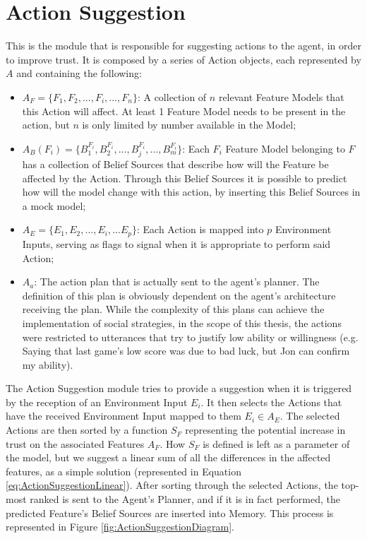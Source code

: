 \section{Action Suggestion}
\label{sec:ActionSuggestion}
This is the module that is responsible for suggesting actions to the agent, in order to improve trust. It is composed by a series of Action objects, each represented by $A$ and containing the following:
\begin{itemize}
    \item $A_F = \{F_1, F_2, ..., F_i, ..., F_n\}$: A collection of $n$ relevant Feature Models that this Action will affect. At least 1 Feature Model needs to be present in the action, but $n$ is only limited by number available in the Model;
    \item $A_B(F_i) = \{B_1^{F_i}, B_2^{F_i}, ..., B_j^{F_i}, ..., B_m^{F_i}\}$: Each $F_i$ Feature Model belonging to $F$ has a collection of Belief Sources that describe how will the Feature be affected by the Action. Through this Belief Sources it is possible to predict how will the model change with this action, by inserting this Belief Sources in a mock model;
    \item $A_E = \{E_1, E_2, ..., E_i, ... E_p\}$: Each Action is mapped into $p$ Environment Inputs, serving as flags to signal when it is appropriate to perform said Action;
    \item $A_a$: The action plan that is actually sent to the agent's planner. The definition of this plan is obviously dependent on the agent's architecture receiving the plan. While the complexity of this plans can achieve the implementation of social strategies, in the scope of this thesis, the actions were restricted to utterances that try to justify low ability or willingness (e.g. Saying that last game's low score was due to bad luck, but Jon can confirm my ability).
\end{itemize}

The Action Suggestion module tries to provide a suggestion when it is triggered by the reception of an Environment Input $E_i$. It then selects the Actions that have the received Environment Input mapped to them $E_i \in A_E$. The selected Actions are then sorted by a function $S_F$ representing the potential increase in trust on the associated Features $A_F$. How $S_F$ is defined is left as a parameter of the model, but we suggest a linear sum of all the differences in the affected features, as a simple solution (represented in Equation \ref{eq:ActionSuggestionLinear}). After sorting through the selected Actions, the top-most ranked is sent to the Agent's Planner, and if it is in fact performed, the predicted Feature's Belief Sources are inserted into Memory. This process is represented in Figure \ref{fig:ActionSuggestionDiagram}.

